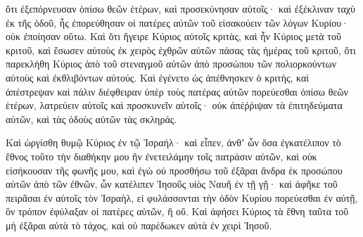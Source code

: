 {ὅτι ἐξεπόρνευσαν ὀπίσω θεῶν ἑτέρων, καὶ προσεκύνησαν αὐτοῖς· καὶ ἐξέκλιναν ταχὺ ἐκ τῆς ὁδοῦ, ἧς ἐπορεύθησαν οἱ πατέρες αὐτῶν τοῦ εἰσακούειν τῶν λόγων Κυρίου· οὐκ ἐποίησαν οὕτω.
Καὶ ὅτι ἤγειρε Κύριος αὐτοῖς κριτὰς, καὶ ἦν Κύριος μετὰ τοῦ κριτοῦ, καὶ ἔσωσεν αὐτοὺς ἐκ χειρὸς ἐχθρῶν αὐτῶν πάσας τὰς ἡμέρας τοῦ κριτοῦ, ὅτι παρεκλήθη Κύριος ἀπὸ τοῦ στεναγμοῦ αὐτῶν ἀπὸ προσώπου τῶν πολιορκούντων αὐτοὺς καὶ ἐκθλιβόντων αὐτούς.
Καὶ ἐγένετο ὡς ἀπέθνησκεν ὁ κριτὴς, καὶ ἀπέστρεψαν καὶ πάλιν διέφθειραν ὑπὲρ τοὺς πατέρας αὐτῶν πορεύεσθαι ὀπίσω θεῶν ἑτέρων, λατρεύειν αὐτοῖς καὶ προσκυνεῖν αὐτοῖς· οὐκ ἀπέῤῥιψαν τὰ ἐπιτηδεύματα αὐτῶν, καὶ τὰς ὁδοὺς αὐτῶν τὰς σκληράς.
\par }{\PP {}Καὶ ὠργίσθη θυμῷ Κύριος ἐν τῷ Ἰσραήλ· καὶ εἶπεν, ἀνθʼ ὧν ὅσα ἐγκατέλιπον τὸ ἔθνος τοῦτο τὴν διαθήκην μου ἣν ἐνετειλάμην τοῖς πατράσιν αὐτῶν, καὶ οὐκ εἰσήκουσαν τῆς φωνῆς μου,
καὶ ἐγὼ οὐ προσθήσω τοῦ ἐξᾶραι ἄνδρα ἐκ προσώπου αὐτῶν ἀπὸ τῶν ἐθνῶν, ὧν κατέλιπεν Ἰησοῦς υἱὸς Ναυῆ ἐν τῇ γῇ· καὶ ἀφῆκε
τοῦ πειρᾶσαι ἐν αὐτοῖς τὸν Ἰσραὴλ, εἰ φυλάσσονται τὴν ὁδὸν Κυρίου πορεύεσθαι ἐν αὐτῇ, ὃν τρόπον ἐφύλαξαν οἱ πατέρες αὐτῶν, ἢ οὔ.
Καὶ ἀφήσει Κύριος τὰ ἔθνη ταῦτα τοῦ μὴ ἐξᾶραι αὐτὰ τὸ τάχος, καὶ οὐ παρέδωκεν αὐτὰ ἐν χειρὶ Ἰησοῦ.

}

